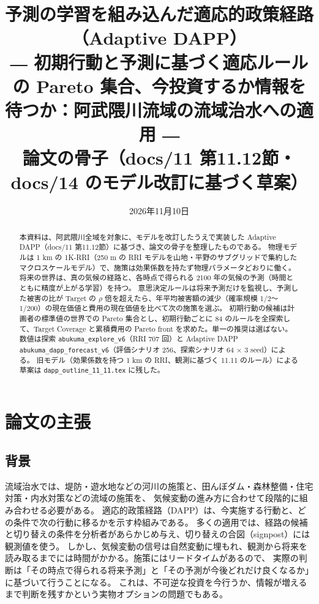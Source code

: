\documentclass[a4paper,10pt]{ltjsarticle}
\title{予測の学習を組み込んだ適応的政策経路（Adaptive DAPP）\\[2pt]
\large ― 初期行動と予測に基づく適応ルールの Pareto 集合、今投資するか情報を待つか：阿武隈川流域の流域治水への適用 ―\\[6pt]
\normalsize 論文の骨子（docs/11 第11.12節・docs/14 のモデル改訂に基づく草案）}
\author{}
\date{2026年11月10日}
\begin{document}
\maketitle

\begin{abstract}
本資料は、阿武隈川全域を対象に、モデルを改訂したうえで実装した Adaptive DAPP（docs/11 第11.12節）に基づき、論文の骨子を整理したものである。
物理モデルは 1 km の 1K-RRI（250 m の RRI モデルを山地・平野のサブグリッドで集約したマクロスケールモデル）\cite{sugawara2024}で、施策は効果係数を持たず物理パラメータどおりに働く。
将来の世界は、真の気候の経路と、各時点で得られる 2100 年の気候の予測（時間とともに精度が上がる学習）を持つ。
意思決定ルールは将来予測だけを監視し、予測した被害の比が Target の $\rho$ 倍を超えたら、年平均被害額の減少（確率規模 1/2〜1/200）の現在価値と費用の現在価値を比べて次の施策を選ぶ。
初期行動の候補は計画者の標準値の世界での Pareto 集合とし、初期行動ごとに 84 のルールを全探索して、Target Coverage と累積費用の Pareto front を求めた。単一の推奨は選ばない。
数値は探索 \texttt{abukuma\_explore\_v6}（RRI 707 回）と Adaptive DAPP \texttt{abukuma\_dapp\_forecast\_v6}（評価シナリオ 256、探索シナリオ 64 × 3 seed）による。
旧モデル（効果係数を持つ 1 km の RRI、観測に基づく 11.11 のルール）による草案は \texttt{dapp\_outline\_11\_11.tex} に残した。
\end{abstract}

\tableofcontents
\bigskip

\section{論文の主張}
\label{sec:claim}

\subsection{背景}
流域治水では、堤防・遊水地などの河川の施策と、田んぼダム・森林整備・住宅対策・内水対策などの流域の施策を、
気候変動の進み方に合わせて段階的に組み合わせる必要がある\cite{mlit_ryuiki,mlit_teigen}。
適応的政策経路（DAPP）\cite{haasnoot2013}は、今実施する行動と、どの条件で次の行動に移るかを示す枠組みである。
多くの適用では、経路の候補と切り替えの条件を分析者があらかじめ与え、切り替えの合図（signpost）には観測値を使う\cite{haasnoot2018,hermans2017}。
しかし、気候変動の信号は自然変動に埋もれ、観測から将来を読み取るまでには時間がかかる。施策にはリードタイムがあるので、
実際の判断は「その時点で得られる将来予測」と「その予測が今後どれだけ良くなるか」に基づいて行うことになる。
これは、不可逆な投資を今行うか、情報が増えるまで判断を残すかという実物オプションの問題\cite{dixit1994,raiffa1961}でもある。
\end{document}
